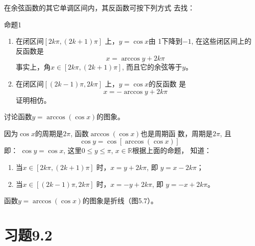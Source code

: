 在余弦函数的其它单调区间内，其反函数可按下列方式
去找：

\begin{blk}{命题1}
\begin{enumerate}
    \item 在闭区间$[2k\pi ,(2k+1)\pi]$ 上，$y=\cos x$由
    1下降到$-1$, 在这些闭区间上的反函数是
 \[   x=\arccos y+2k\pi \]
    事实上，角$x\in [2k\pi ,(2k+1)\pi]$, 而且它的余弦等于$y$。
    \item 在闭区间$[(2k-1)\pi ,2k\pi]$ 上，$y=\cos x$的反函数
    是
\[    x=-\arccos y+2k\pi \]
    证明相仿。
\end{enumerate}
\end{blk}

\begin{example}
    讨论函数$y=\arccos(\cos x)$的图象。
\end{example}

\begin{solution}
因为$\cos x$的周期是$2\pi$, 函数$\arccos(\cos x)$也是周期函
数，周期是$2\pi$, 且
\[\cos y=\cos[\arccos(\cos x)]\]
即：
$\cos y=\cos x$, 这里$0\le y\le \pi$, $x\in\mathbb{R}$根据上面的命题，
知道：
\begin{enumerate}
    \item 当$x\in[2k\pi ,(2k+1)\pi]$ 时，$x=y+2k\pi$, 即
$y=x-2k\pi$；
\item  当$x\in[(2k-1)\pi ,2k\pi]$ 时，$x=-y+2k\pi$, 即
$y=-x+2k\pi$。
\end{enumerate}
函数$y=\arccos(\cos x)$的图象是折线（图5.7）。

\begin{figure}[htp]
    \centering
{}    
    \caption{}
\end{figure}
\end{solution}


\section*{习题9.2}

